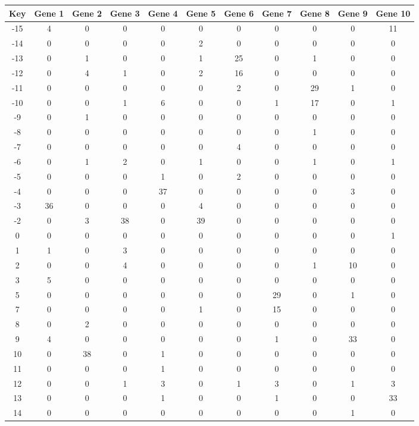\begin{tabular}{|c|c|c|c|c|c|c|c|c|c|c|}
\hline
Key & Gene 1 & Gene 2 & Gene 3 & Gene 4 & Gene 5 & Gene 6 & Gene 7 & Gene 8 & Gene 9 & Gene 10 \\
\hline
-15 & 4 & 0 & 0 & 0 & 0 & 0 & 0 & 0 & 0 & 11 \\
-14 & 0 & 0 & 0 & 0 & 2 & 0 & 0 & 0 & 0 & 0 \\
-13 & 0 & 1 & 0 & 0 & 1 & 25 & 0 & 1 & 0 & 0 \\
-12 & 0 & 4 & 1 & 0 & 2 & 16 & 0 & 0 & 0 & 0 \\
-11 & 0 & 0 & 0 & 0 & 0 & 2 & 0 & 29 & 1 & 0 \\
-10 & 0 & 0 & 1 & 6 & 0 & 0 & 1 & 17 & 0 & 1 \\
-9 & 0 & 1 & 0 & 0 & 0 & 0 & 0 & 0 & 0 & 0 \\
-8 & 0 & 0 & 0 & 0 & 0 & 0 & 0 & 1 & 0 & 0 \\
-7 & 0 & 0 & 0 & 0 & 0 & 4 & 0 & 0 & 0 & 0 \\
-6 & 0 & 1 & 2 & 0 & 1 & 0 & 0 & 1 & 0 & 1 \\
-5 & 0 & 0 & 0 & 1 & 0 & 2 & 0 & 0 & 0 & 0 \\
-4 & 0 & 0 & 0 & 37 & 0 & 0 & 0 & 0 & 3 & 0 \\
-3 & 36 & 0 & 0 & 0 & 4 & 0 & 0 & 0 & 0 & 0 \\
-2 & 0 & 3 & 38 & 0 & 39 & 0 & 0 & 0 & 0 & 0 \\
0 & 0 & 0 & 0 & 0 & 0 & 0 & 0 & 0 & 0 & 1 \\
1 & 1 & 0 & 3 & 0 & 0 & 0 & 0 & 0 & 0 & 0 \\
2 & 0 & 0 & 4 & 0 & 0 & 0 & 0 & 1 & 10 & 0 \\
3 & 5 & 0 & 0 & 0 & 0 & 0 & 0 & 0 & 0 & 0 \\
5 & 0 & 0 & 0 & 0 & 0 & 0 & 29 & 0 & 1 & 0 \\
7 & 0 & 0 & 0 & 0 & 1 & 0 & 15 & 0 & 0 & 0 \\
8 & 0 & 2 & 0 & 0 & 0 & 0 & 0 & 0 & 0 & 0 \\
9 & 4 & 0 & 0 & 0 & 0 & 0 & 1 & 0 & 33 & 0 \\
10 & 0 & 38 & 0 & 1 & 0 & 0 & 0 & 0 & 0 & 0 \\
11 & 0 & 0 & 0 & 1 & 0 & 0 & 0 & 0 & 0 & 0 \\
12 & 0 & 0 & 1 & 3 & 0 & 1 & 3 & 0 & 1 & 3 \\
13 & 0 & 0 & 0 & 1 & 0 & 0 & 1 & 0 & 0 & 33 \\
14 & 0 & 0 & 0 & 0 & 0 & 0 & 0 & 0 & 1 & 0 \\
\hline
\end{tabular}